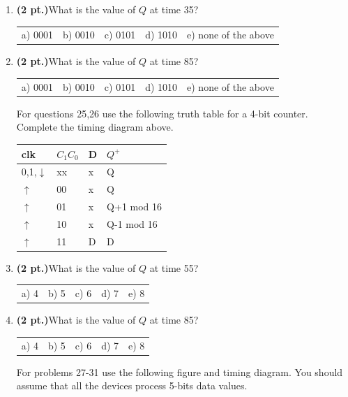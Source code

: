 \documentclass{article}
\begin{document}
\begin{enumerate}

\item {\bf (2 pt.)}What is the value of $Q$ at time 35?

\begin{tabular}{p{0.6in} p{0.6in} p{0.6in} p{0.6in} l}
a) 0001 & b) 0010 & c) 0101 & d) 1010 & e) none of the above
\end{tabular}

\item {\bf (2 pt.)}What is the value of $Q$ at time 85?

\begin{tabular}{p{0.6in} p{0.6in} p{0.6in} p{0.6in} l}
a) 0001 & b) 0010 & c) 0101 & d) 1010 & e) none of the above
\end{tabular}

For questions 25,26 use the following truth table for a 4-bit
counter. Complete the timing diagram above.

\begin{tabular}{l|l|l||l}
clk             & $C_1 C_0$     & D & $Q^+$     \\ \hline
0,1,$\downarrow$& xx            & x & Q         \\ \hline
$\uparrow$      & 00            & x & Q         \\  \hline
$\uparrow$      & 01            & x & Q+1 mod 16\\  \hline
$\uparrow$      & 10            & x & Q-1 mod 16\\  \hline
$\uparrow$      & 11            & D & D         \\
\end{tabular}

\item {\bf (2 pt.)}What is the value of $Q$ at time 55?

\begin{tabular}{p{0.6in} p{0.6in} p{0.6in} p{0.6in} l}
a) 4 & b) 5 & c) 6 & d) 7 & e) 8
\end{tabular}

\item {\bf (2 pt.)}What is the value of $Q$ at time 85?

\begin{tabular}{p{0.6in} p{0.6in} p{0.6in} p{0.6in} l}
a) 4 & b) 5 & c) 6 & d) 7 & e) 8
\end{tabular}


\pagebreak
For problems 27-31 use the following figure and timing diagram.
You should assume that all the devices process 5-bits data 
values.


\end{enumerate}
\end{document}
